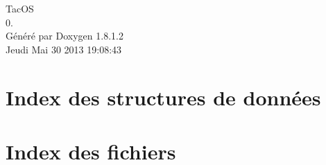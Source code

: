 \documentclass{book}
\begin{document}
\hypersetup{pageanchor=false,citecolor=blue}
\begin{titlepage}
\vspace*{7cm}
\begin{center}
{\Large Tac\-O\-S \\[1ex]\large 0. }\\
\vspace*{1cm}
{\large Généré par Doxygen 1.8.1.2}\\
\vspace*{0.5cm}
{\small Jeudi Mai 30 2013 19:08:43}\\
\end{center}
\end{titlepage}
\clearemptydoublepage
{}
\tableofcontents
\clearemptydoublepage
{}
\hypersetup{pageanchor=true,citecolor=blue}
\chapter{Index des structures de données}

\chapter{Index des fichiers}

\end{document}
